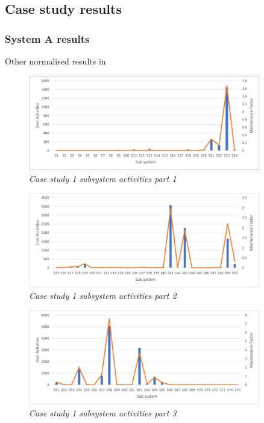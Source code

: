 \subsection{Case study results}

\subsubsection{System A results}
Other normalised results in 

\begin{figure}[!htb]
	\centering %
	\includegraphics[width=0.9\textwidth]{img/ch3/uat/systemA/s1_s24.png}
	\caption[Case study 1 subsystem activities part 1]
	{\textit{Case study 1 subsystem activities part 1}}\label{fig:ch3_saS1S24}
\end{figure} 

\begin{figure}[!htb]
	\centering %
	\includegraphics[width=0.9\textwidth]{img/ch3/uat/systemA/s25_s50.png}
	\caption[Case study 1 subsystem activities part 2]
	{\textit{Case study 1 subsystem activities part 2}}\label{fig:ch3_saS25S50}
\end{figure} 

\begin{figure}[!htb]
	\centering %
	\includegraphics[width=0.9\textwidth]{img/ch3/uat/systemA/s51_s75.png}
	\caption[Case study 1 subsystem activities part 3]
	{\textit{Case study 1 subsystem activities part 3}}\label{fig:ch3_saS51S75}
\end{figure} 

